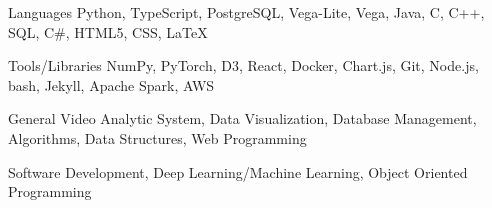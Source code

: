 

\begin{cvskills}

  \cvskill
    {Languages} %
    {Python, TypeScript, PostgreSQL, Vega-Lite, Vega, Java, C, C++, SQL, C\#, HTML5, CSS, LaTeX} %

  \cvskill
    {Tools/Libraries} %
    {NumPy, PyTorch, D3, React, Docker, Chart.js, Git, Node.js, bash, Jekyll, Apache Spark, AWS} %

  \cvskill
    {General} %
    {Video Analytic System, Data Visualization, Database Management, Algorithms, Data Structures, Web Programming} %

  \cvskill
    {} %
    {Software Development, Deep Learning/Machine Learning, Object Oriented Programming} %

\end{cvskills}